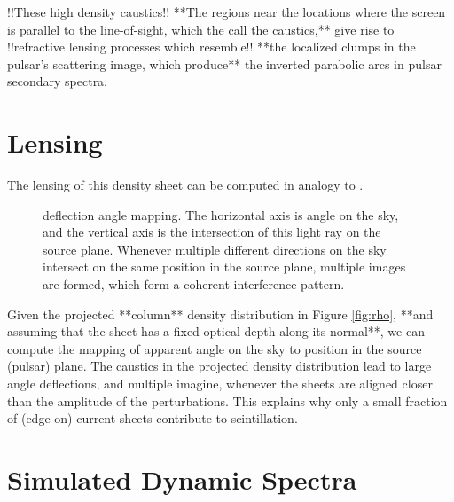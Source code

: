 \documentclass[useAMS,usenatbib]{mn2e}
\begin{document}
!!These high density caustics!! **The regions near the locations where the screen is parallel
to the line-of-sight, which the call the caustics,** give rise to !!refractive lensing processes
which resemble!! **the localized clumps in the pulsar's scattering image, which
produce** the inverted parabolic arcs in pulsar secondary
spectra.

\section{Lensing}

The lensing of this density sheet can be computed in analogy to 
 \cite{2012MNRAS.421L.132P}.

\begin{figure}
\centerline{}
\caption{deflection angle mapping. The horizontal axis is angle on the
sky, and the vertical axis is the intersection of this light ray on
the source plane.  Whenever multiple different directions on the sky
intersect on the same position in the source plane, multiple images
are formed, which form a coherent interference pattern.}
\label{fig:dt}
\end{figure}

Given the projected **column** density distribution in Figure \ref{fig:rho}, **and assuming that
the sheet has a fixed optical depth along its normal**, we
can compute the mapping of apparent angle on the sky to position in the
source (pulsar) plane.  The caustics in the projected density
distribution lead to large angle deflections, and multiple imagine,
whenever the sheets are aligned closer than the amplitude of the
perturbations.  This explains why only a small fraction of (edge-on) current
sheets contribute to scintillation.

\section{Simulated Dynamic Spectra}
\end{document}
